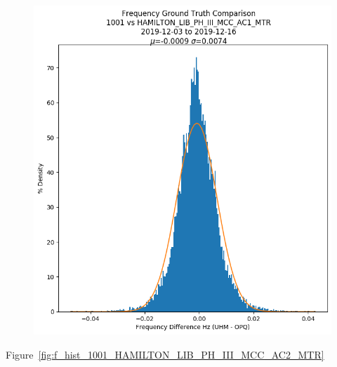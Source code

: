 \begin{figure}[H]
    \centering
    \includegraphics[width=\linewidth]{figures/f_hist_1001_HAMILTON_LIB_PH_III_MCC_AC1_MTR.png}
    \caption{}
    \label{fig:f_hist_1001_HAMILTON_LIB_PH_III_MCC_AC1_MTR}
\end{figure}

Figure~\ref{fig:f_hist_1001_HAMILTON_LIB_PH_III_MCC_AC2_MTR}

